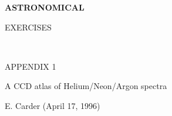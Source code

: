 \documentclass[12pt]{article}
\begin{document}
\newpage




\pagestyle{empty}
\vspace*{6cm}

\begin{center}
{\Large\bf ASTRONOMICAL

EXERCISES}
\end{center}


\newpage


\newpage
\pagestyle{empty}
~



\newpage











\newpage

\pagestyle{empty}

\vspace{2cm} 






\centerline{\hspace{-2cm}  \Huge APPENDIX 1}

\vspace{4cm} 


\centerline{\Large \hspace{-1cm} A CCD atlas of Helium/Neon/Argon spectra}

\vspace{1cm} 


\centerline{\hspace{-1cm} E. Carder (April 17, 1996)}


\newpage


\end{document}
